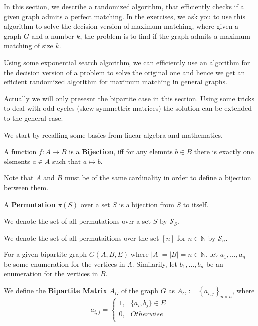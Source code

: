 In this section, we describe a randomized algorithm, that efficiently checks if a given graph admits a perfect matching. In the exercises, we ask you to use this algorithm to solve the decision version of maximum matching, where given a graph $G$ and a number $k$, the problem is to find if the graph admits a maximum matching of size $k$. 

Using some exponential search algorithm, we can efficiently use an algorithm for the decision version of a problem to solve the original one and hence we get an efficient randomized algorithm for maximum matching in general graphs.

Actually we will only presesnt the bipartite case in this section. Using some tricks to deal with odd cycles (skew symmettric matrices) the solution can be extended to the general case.

We start by recalling some basics from linear algebra and mathematics.
\begin{definition}
A function $f:A \mapsto B$ is a \textbf{Bijection}, iff for any elemnts $b \in B$ there is exactly one elements $a \in A$ such that $a \mapsto b$.
\end{definition}
Note that $A$ and $B$ must be of the same cardinality in order to define a bijection between them.

\begin{definition}
	A \textbf{Permutation} $\pi(S)$ over a set $S$ is a bijection from $S$ to itself.
\end{definition}
We denote the set of all permutations over a set $S$ by $\mathcal{S}_S$.

We denote the set of all permutaitions over the set $[n]$ for $n \in \mathbb{N}$ by $\mathcal{S}_n$.

\begin{definition}
	For a given bipartite graph $G(A, B, E)$ where $|A| = |B| = n \in \mathbb{N}$, let $a_1, \dots, a_n$ be some enumeration for the vertices in $A$. Similarily, let $b_1, \dots, b_n$ be an enumeration for the vertices in $B$.
	
	We define the \textbf{Bipartite Matrix} $A_G$ of the graph $G$ as $A_G := \left\{a_{i, j}\right\}_{n \times n}$, where 
	\begin{equation*}
		a_{i,j} =
		\begin{cases}
			1, & \{a_i, b_j\} \in E\\
			0, & Otherwise\\
		\end{cases}
	\end{equation*}
\end{definition}

